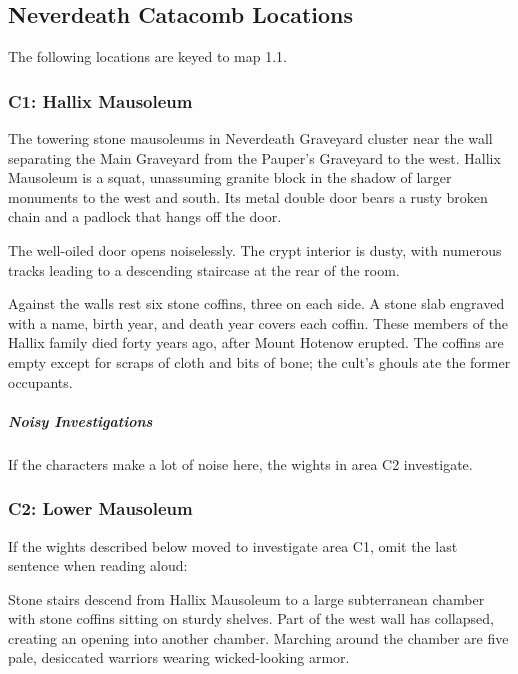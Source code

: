 \documentclass[10pt,a4paper,twoside,bg=print,twocolumn,openany,nodeprecatedcode]{dndbook}
\begin{document}
\subsection{Neverdeath Catacomb Locations}
The following locations are keyed to map 1.1.

\subsubsection{C1: Hallix Mausoleum}
\begin{DndReadAloud}{}
The towering stone mausoleums in Neverdeath Graveyard cluster near the wall separating the Main Graveyard from the Pauper's Graveyard to the west. Hallix Mausoleum is a squat, unassuming granite block in the shadow of larger monuments to the west and south. Its metal double door bears a rusty broken chain and a padlock that hangs off the door.

\end{DndReadAloud}

The well-oiled door opens noiselessly. The crypt interior is dusty, with numerous tracks leading to a descending staircase at the rear of the room.

Against the walls rest six stone coffins, three on each side. A stone slab engraved with a name, birth year, and death year covers each coffin. These members of the Hallix family died forty years ago, after Mount Hotenow erupted. The coffins are empty except for scraps of cloth and bits of bone; the cult's ghouls ate the former occupants.

\subparagraph{Noisy Investigations}
If the characters make a lot of noise here, the wights in area C2 investigate.

\subsubsection{C2: Lower Mausoleum}
If the wights described below moved to investigate area C1, omit the last sentence when reading aloud:

\begin{DndReadAloud}{}
Stone stairs descend from Hallix Mausoleum to a large subterranean chamber with stone coffins sitting on sturdy shelves. Part of the west wall has collapsed, creating an opening into another chamber. Marching around the chamber are five pale, desiccated warriors wearing wicked-looking armor.

\end{DndReadAloud}
\end{document}
